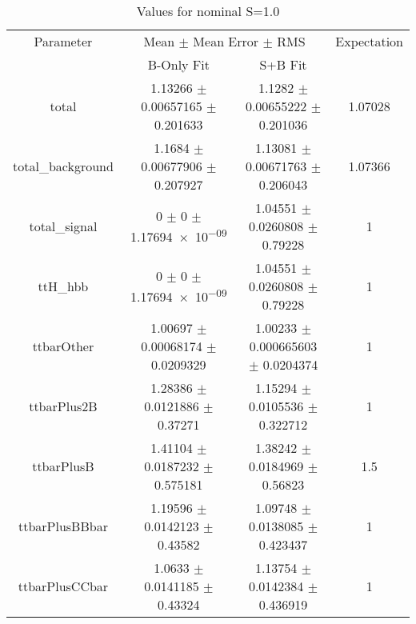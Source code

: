 \begin{table}
\centering
\caption{Values for nominal S=1.0}
\begin{tabular}{cccc}
\toprule
Parameter & \multicolumn{2}{c}{Mean $\pm$ Mean Error $\pm$ RMS} & Expectation\\
 & B-Only Fit & S+B Fit & \\
\midrule
total & \num{1.13266} $\pm$ \num{0.00657165} $\pm$ \num{0.201633} & \num{1.1282} $\pm$ \num{0.00655222} $\pm$ \num{0.201036} & \num{1.07028}\\
total\_background & \num{1.1684} $\pm$ \num{0.00677906} $\pm$ \num{0.207927} & \num{1.13081} $\pm$ \num{0.00671763} $\pm$ \num{0.206043} & \num{1.07366}\\
total\_signal & \num{0} $\pm$ \num{0} $\pm$ \num{1.17694e-09} & \num{1.04551} $\pm$ \num{0.0260808} $\pm$ \num{0.79228} & \num{1}\\
ttH\_hbb & \num{0} $\pm$ \num{0} $\pm$ \num{1.17694e-09} & \num{1.04551} $\pm$ \num{0.0260808} $\pm$ \num{0.79228} & \num{1}\\
ttbarOther & \num{1.00697} $\pm$ \num{0.00068174} $\pm$ \num{0.0209329} & \num{1.00233} $\pm$ \num{0.000665603} $\pm$ \num{0.0204374} & \num{1}\\
ttbarPlus2B & \num{1.28386} $\pm$ \num{0.0121886} $\pm$ \num{0.37271} & \num{1.15294} $\pm$ \num{0.0105536} $\pm$ \num{0.322712} & \num{1}\\
ttbarPlusB & \num{1.41104} $\pm$ \num{0.0187232} $\pm$ \num{0.575181} & \num{1.38242} $\pm$ \num{0.0184969} $\pm$ \num{0.56823} & \num{1.5}\\
ttbarPlusBBbar & \num{1.19596} $\pm$ \num{0.0142123} $\pm$ \num{0.43582} & \num{1.09748} $\pm$ \num{0.0138085} $\pm$ \num{0.423437} & \num{1}\\
ttbarPlusCCbar & \num{1.0633} $\pm$ \num{0.0141185} $\pm$ \num{0.43324} & \num{1.13754} $\pm$ \num{0.0142384} $\pm$ \num{0.436919} & \num{1}\\
\bottomrule
\end{tabular}
\end{table}
